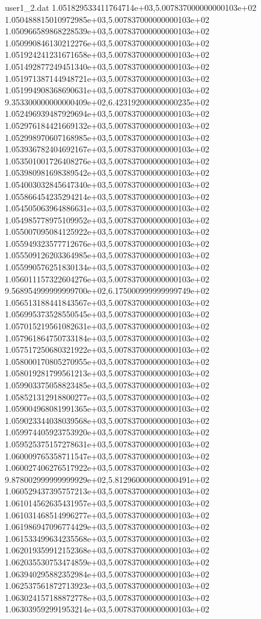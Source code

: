 \begin{filecontents}{user1_2.dat}
1.051829533411764714e+03,5.007837000000000103e+02
1.050488815010972985e+03,5.007837000000000103e+02
1.050966589868228539e+03,5.007837000000000103e+02
1.050990846130212276e+03,5.007837000000000103e+02
1.051924241231671658e+03,5.007837000000000103e+02
1.051492877249451340e+03,5.007837000000000103e+02
1.051971387144948721e+03,5.007837000000000103e+02
1.051994908368690631e+03,5.007837000000000103e+02
9.353300000000000409e+02,6.423192000000000235e+02
1.052496939487929694e+03,5.007837000000000103e+02
1.052976184421669132e+03,5.007837000000000103e+02
1.052998970607168985e+03,5.007837000000000103e+02
1.053936782404692167e+03,5.007837000000000103e+02
1.053501001726408276e+03,5.007837000000000103e+02
1.053980981698389542e+03,5.007837000000000103e+02
1.054003032845647340e+03,5.007837000000000103e+02
1.055866454235294214e+03,5.007837000000000103e+02
1.054505063964886631e+03,5.007837000000000103e+02
1.054985778975109952e+03,5.007837000000000103e+02
1.055007095084125922e+03,5.007837000000000103e+02
1.055949323577712676e+03,5.007837000000000103e+02
1.055509126203364985e+03,5.007837000000000103e+02
1.055990576251830134e+03,5.007837000000000103e+02
1.056011157322604276e+03,5.007837000000000103e+02
9.568954999999999700e+02,6.175000999999999749e+02
1.056513188441843567e+03,5.007837000000000103e+02
1.056995373528550545e+03,5.007837000000000103e+02
1.057015219561082631e+03,5.007837000000000103e+02
1.057961864750733184e+03,5.007837000000000103e+02
1.057517250680321922e+03,5.007837000000000103e+02
1.058000170805270955e+03,5.007837000000000103e+02
1.058019281799561213e+03,5.007837000000000103e+02
1.059903375058823485e+03,5.007837000000000103e+02
1.058521312918800277e+03,5.007837000000000103e+02
1.059004968081991365e+03,5.007837000000000103e+02
1.059023344038039568e+03,5.007837000000000103e+02
1.059974405923753920e+03,5.007837000000000103e+02
1.059525375157278631e+03,5.007837000000000103e+02
1.060009765358711547e+03,5.007837000000000103e+02
1.060027406276517922e+03,5.007837000000000103e+02
9.878002999999999929e+02,5.812960000000000491e+02
1.060529437395757213e+03,5.007837000000000103e+02
1.061014562635431957e+03,5.007837000000000103e+02
1.061031468514996277e+03,5.007837000000000103e+02
1.061986947096774429e+03,5.007837000000000103e+02
1.061533499634235568e+03,5.007837000000000103e+02
1.062019359912152368e+03,5.007837000000000103e+02
1.062035530753474859e+03,5.007837000000000103e+02
1.063940295882352984e+03,5.007837000000000103e+02
1.062537561872713923e+03,5.007837000000000103e+02
1.063024157188872778e+03,5.007837000000000103e+02
1.063039592991953214e+03,5.007837000000000103e+02

\end{filecontents}
